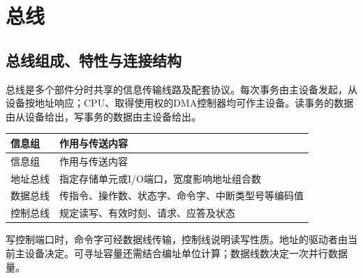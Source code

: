 \chapter{总线}\label{CO06}

\section{总线组成、特性与连接结构}\label{CO06-structure}

总线是多个部件分时共享的信息传输线路及配套协议。每次事务由主设备发起，从设备按地址响应；CPU、取得使用权的DMA控制器均可作主设备。读事务的数据由从设备给出，写事务的数据由主设备给出。

\par\smallskip
{\fontsize{9.3}{12}\selectfont\setlength{\tabcolsep}{2.5pt}\setlength{\LTleft}{0pt}\setlength{\LTright}{0pt}
\begin{longtable}{@{}>{\raggedright\arraybackslash}p{}>{\raggedright\arraybackslash}p{}@{}}
\toprule
信息组 & 作用与传送内容 \\

\midrule\endfirsthead\toprule
信息组 & 作用与传送内容 \\

\midrule\endhead\bottomrule\endfoot
地址总线 & 指定存储单元或I/O端口，宽度影响地址组合数 \\

数据总线 & 传指令、操作数、状态字、命令字、中断类型号等编码值 \\

控制总线 & 规定读写、有效时刻、请求、应答及状态 \\

\end{longtable}}
\par\smallskip

写控制端口时，命令字可经数据线传输，控制线说明读写性质。地址的驱动者由当前主设备决定。可寻址容量还需结合编址单位计算；数据线数决定一次并行数据量。


